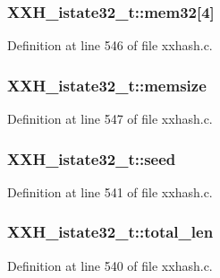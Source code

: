 \subsubsection[{mem32}]{ X\+X\+H\+\_\+istate32\+\_\+t\+::mem32\mbox{[}4\mbox{]}}\label{struct_x_x_h__istate32__t_a5a135d71eca5187fe5d12890cb7c76d4}


Definition at line 546 of file xxhash.\+c.

\hypertarget{struct_x_x_h__istate32__t_ad84d2d64d2867bca27555196bff172d3}{}
\subsubsection[{memsize}]{ X\+X\+H\+\_\+istate32\+\_\+t\+::memsize}\label{struct_x_x_h__istate32__t_ad84d2d64d2867bca27555196bff172d3}


Definition at line 547 of file xxhash.\+c.

\hypertarget{struct_x_x_h__istate32__t_aa838ccfe91463ae3508ca756efdd3ca5}{}
\subsubsection[{seed}]{ X\+X\+H\+\_\+istate32\+\_\+t\+::seed}\label{struct_x_x_h__istate32__t_aa838ccfe91463ae3508ca756efdd3ca5}


Definition at line 541 of file xxhash.\+c.

\hypertarget{struct_x_x_h__istate32__t_a8b358b224ecd8fe9412e90d1bc7d0261}{}
\subsubsection[{total\+\_\+len}]{ X\+X\+H\+\_\+istate32\+\_\+t\+::total\+\_\+len}\label{struct_x_x_h__istate32__t_a8b358b224ecd8fe9412e90d1bc7d0261}


Definition at line 540 of file xxhash.\+c.

